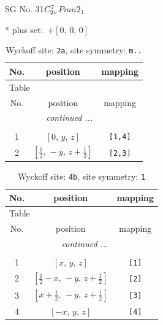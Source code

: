 \documentclass[fleqn,8pt]{jsarticle}
\begin{document}
\setcounter{MaxMatrixCols}{32}

\renewcommand{\tablename}{Table~}
\renewcommand{\figurename}{Figure~}
\begin{center}
\LARGE
SG No. 31\quad$C_{\rm 2v}^{7}$\quad$Pmn2_1$\quad[ orthorhombic ]
\end{center}
* plus set:\,\,\,$+\left[ 0,\, 0,\, 0 \right]$
\renewcommand{\arraystretch}{1.2}
\begin{longtable}{ccc}
\caption{Wyckoff site: {\tt 2a}, site symmetry: {\tt m..}}
 \\
 \hline \hline
No. & position & mapping \\ \hline \endfirsthead

\multicolumn{2}{l}{\tablename\ \thetable{}} \\
 \hline \hline
No. & position & mapping \\ \hline \endhead

 \hline \hline
\multicolumn{2}{r}{\footnotesize\it continued ...} \\ \endfoot

 \hline \hline
\multicolumn{2}{r}{} \\ \endlastfoot

1 & $\left[ 0,\, y,\, z \right]$ & {\tt [1,4]} \\ \hline
2 & $\left[ \frac{1}{2},\, - y,\, z + \frac{1}{2} \right]$ & {\tt [2,3]} \\
\end{longtable}
\renewcommand{\arraystretch}{1.2}
\begin{longtable}{ccc}
\caption{Wyckoff site: {\tt 4b}, site symmetry: {\tt 1}}
 \\
 \hline \hline
No. & position & mapping \\ \hline \endfirsthead

\multicolumn{2}{l}{\tablename\ \thetable{}} \\
 \hline \hline
No. & position & mapping \\ \hline \endhead

 \hline \hline
\multicolumn{2}{r}{\footnotesize\it continued ...} \\ \endfoot

 \hline \hline
\multicolumn{2}{r}{} \\ \endlastfoot

1 & $\left[ x,\, y,\, z \right]$ & {\tt [1]} \\ \hline
2 & $\left[ \frac{1}{2} - x,\, - y,\, z + \frac{1}{2} \right]$ & {\tt [2]} \\ \hline
3 & $\left[ x + \frac{1}{2},\, - y,\, z + \frac{1}{2} \right]$ & {\tt [3]} \\ \hline
4 & $\left[ - x,\, y,\, z \right]$ & {\tt [4]} \\
\end{longtable}
\end{document}
